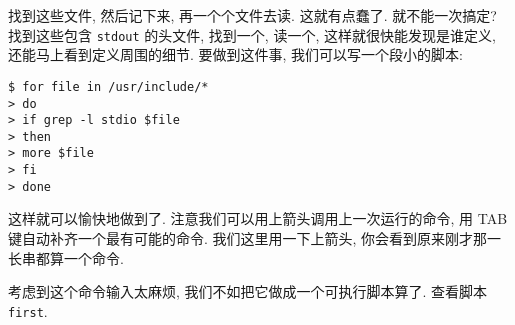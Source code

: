 \documentclass[a4paper]{ctexart}
\begin{document}
找到这些文件, 然后记下来, 再一个个文件去读. 这就有点蠢了. 就不能一次搞定? 找到这些包含
\verb|stdout| 的头文件, 找到一个, 读一个, 这样就很快能发现是谁定义, 还能马上看到定义周围的细节.
要做到这件事, 我们可以写一个段小的脚本:

\begin{verbatim}
$ for file in /usr/include/*
> do
> if grep -l stdio $file
> then
> more $file
> fi
> done
\end{verbatim}

这样就可以愉快地做到了. 注意我们可以用上箭头调用上一次运行的命令, 用 TAB 键自动补齐一个最有可能的命令.
我们这里用一下上箭头, 你会看到原来刚才那一长串都算一个命令.

考虑到这个命令输入太麻烦, 我们不如把它做成一个可执行脚本算了.
查看脚本 \verb|first|. 







\end{document}
